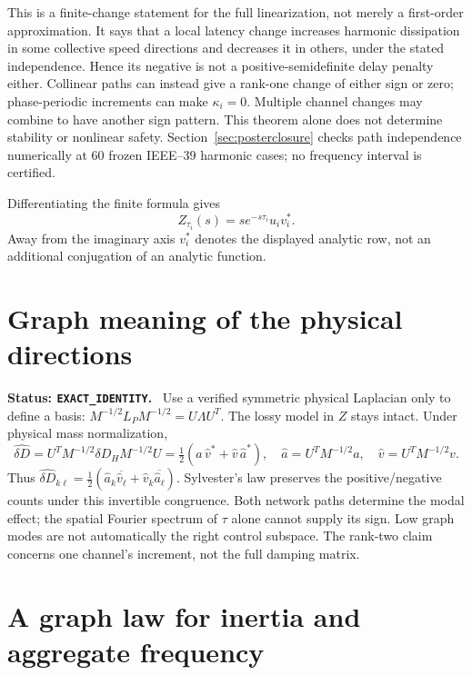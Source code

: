 \documentclass[11pt]{article}
\newcommand{\status}[1]{\par\smallskip\noindent\textbf{Status: \texttt{#1}.}\ }
\begin{document}
This is a finite-change statement for the full linearization, not
merely a first-order approximation. It says that a local latency
change increases harmonic dissipation in some collective speed
directions and decreases it in others, under the stated independence.
Hence its negative is not a positive-semidefinite delay penalty either.
Collinear paths can instead give a rank-one change of either sign or
zero; phase-periodic increments can make $\kappa_i=0$.
Multiple channel changes may combine to have another sign pattern.
This theorem alone does not determine stability or nonlinear safety.
Section~\ref{sec:posterclosure} checks path independence numerically at 60 frozen IEEE--39 harmonic cases; no frequency interval is certified.

Differentiating the finite formula gives
\begin{equation}
 Z_{\tau_i}(s)=s e^{-s\tau_i}u_iv_i^* . \label{eq:derivative}
\end{equation}
Away from the imaginary axis $v_i^*$ denotes the displayed analytic
row, not an additional conjugation of an analytic function.

\section{Graph meaning of the physical directions}
\status{EXACT\_IDENTITY}
Use a verified symmetric physical Laplacian only to define a basis:
$M^{-1/2}L_PM^{-1/2}=U\Lambda U^T$. The lossy model in $Z$ stays intact.
Under physical mass normalization,
\[
 \widehat{\delta D}=U^TM^{-1/2}\delta D_HM^{-1/2}U
 =\tfrac12(\widehat a\,\widehat v^*+\widehat v\,\widehat a^*),
 \quad \widehat a=U^TM^{-1/2}a,\quad \widehat v=U^TM^{-1/2}v .
\]
Thus $\widehat{\delta D}_{k\ell}
=\tfrac12(\widehat a_k\overline{\widehat v_\ell}
+\widehat v_k\overline{\widehat a_\ell})$.
Sylvester's law preserves the positive/negative counts under this
invertible congruence. Both network paths determine the modal effect;
the spatial Fourier spectrum of $\tau$ alone cannot supply its sign.
Low graph modes are not automatically the right control subspace.
The rank-two claim concerns one channel's increment, not the full
damping matrix.

\section{A graph law for inertia and aggregate frequency}
\end{document}

